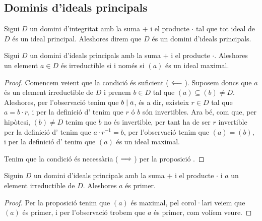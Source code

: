 \documentclass[../Apunts.tex]{subfiles}
\begin{document}
	\subsection{Dominis d'ideals principals}
	\begin{definition}
		\label{def:domini d'ideals principals}
		\label{def:DIP}
		Sigui \(D\) un domini d'integritat amb la suma \(+\) i el producte \(\cdot\) tal que tot ideal de \(D\) és un ideal principal. Aleshores direm que \(D\) és un domini d'ideals principals.
	\end{definition}
	\begin{proposition}
		\label{prop:irreductible sii ideal maximal}
		Sigui \(D\) un domini d'ideals principals amb la suma \(+\) i el producte \(\cdot\). Aleshores un element \(a\in D\) és irreductible si i només si \((a)\) és un ideal maximal.
		\begin{proof}
			Comencem veient que la condició és suficient (\(\impliedby\)). Suposem doncs que \(a\) és un element irreductible de \(D\) i prenem \(b\in D\) tal que \((a)\subseteq(b)\neq D\). Aleshores, per l'observació  tenim que \(b\mathrel{|} a\), és a dir, existeix \(r\in D\) tal que \(a=b\cdot r\), i per la definició d' tenim que \(r\) ó \(b\) són invertibles. Ara bé, com que, per hipòtesi, \((b)\neq D\) tenim que \(b\) no és invertible, %
			per tant ha de ser \(r\) invertible per la definició d' tenim que \(a\cdot r^{-1}=b\), per l'observació  tenim que \((a)=(b)\), i per la definició d' tenim que \((a)\) és un ideal maximal.
			
			Tenim que la condició és necessària (\(\implies\)) per la proposició . %
		\end{proof}
	\end{proposition}
	\begin{proposition}
		\label{prop:en DIP irreductible implica primer}
		Siguin \(D\) un domini d'ideals principals amb la suma \(+\) i el producte \(\cdot\) i \(a\) un element irreductible de \(D\). Aleshores \(a\) és primer.
		\begin{proof}
			Per la proposició  tenim que \((a)\) és maximal, pel corol·lari  veiem que \((a)\) és primer, i per l'observació  trobem que \(a\) és primer, com volíem veure.
		\end{proof}
	\end{proposition}
\end{document}
